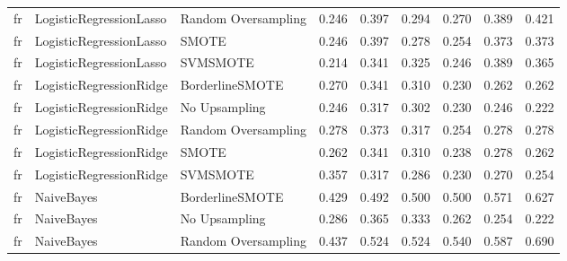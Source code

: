 \begin{tabular}{lllllllll}
      fr &      LogisticRegressionLasso & Random Oversampling & 0.246 &                     0.397 &                 0.294 &                  0.270 &                                   0.389 &     0.421 \\
      fr &      LogisticRegressionLasso &               SMOTE & 0.246 &                     0.397 &                 0.278 &                  0.254 &                                   0.373 &     0.373 \\
      fr &      LogisticRegressionLasso &            SVMSMOTE & 0.214 &                     0.341 &                 0.325 &                  0.246 &                                   0.389 &     0.365 \\
      fr &      LogisticRegressionRidge &     BorderlineSMOTE & 0.270 &                     0.341 &                 0.310 &                  0.230 &                                   0.262 &     0.262 \\
      fr &      LogisticRegressionRidge &       No Upsampling & 0.246 &                     0.317 &                 0.302 &                  0.230 &                                   0.246 &     0.222 \\
      fr &      LogisticRegressionRidge & Random Oversampling & 0.278 &                     0.373 &                 0.317 &                  0.254 &                                   0.278 &     0.278 \\
      fr &      LogisticRegressionRidge &               SMOTE & 0.262 &                     0.341 &                 0.310 &                  0.238 &                                   0.278 &     0.262 \\
      fr &      LogisticRegressionRidge &            SVMSMOTE & 0.357 &                     0.317 &                 0.286 &                  0.230 &                                   0.270 &     0.254 \\
      fr &                   NaiveBayes &     BorderlineSMOTE & 0.429 &                     0.492 &                 0.500 &                  0.500 &                                   0.571 &     0.627 \\
      fr &                   NaiveBayes &       No Upsampling & 0.286 &                     0.365 &                 0.333 &                  0.262 &                                   0.254 &     0.222 \\
      fr &                   NaiveBayes & Random Oversampling & 0.437 &                     0.524 &                 0.524 &                  0.540 &                                   0.587 &     0.690 \\

\end{tabular}
